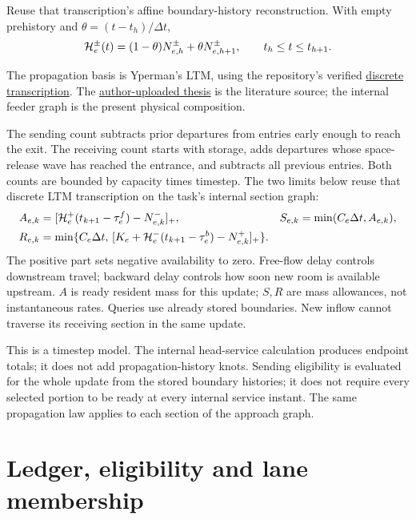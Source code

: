\documentclass[10pt,a4paper]{article}
\newcommand{\pos}[1]{[#1]_+}
\begin{document}
Reuse that transcription's affine boundary-history reconstruction.
With empty prehistory and $\theta=(t-t_h)/\Delta t$,
\begin{equation}
 {\cal H}^{\pm}_e(t)
 =(1-\theta)N^\pm_{e,h}+\theta N^\pm_{e,h+1},
 \qquad t_h\leq t\leq t_{h+1}.
 \label{eq:history}
\end{equation}

The propagation basis is Yperman's LTM, using the repository's verified
\href{../../../../docs/milestones/milestone_0_ltm_baseline.md}{discrete transcription}.
The \href{https://www.researchgate.net/publication/28360292_The_Link_Transmission_Model_for_dynamic_network_loading}{author-uploaded thesis}
is the literature source; the internal feeder graph is the present
physical composition.
\par

The sending count subtracts prior departures from entries early enough
to reach the exit. The receiving count starts with storage, adds departures
whose space-release wave has reached the entrance, and subtracts all
previous entries. Both counts are bounded by capacity times timestep.
The two limits below reuse that discrete LTM transcription on the task's internal section graph:
\begin{align}
 A_{e,k}&=\pos{{\cal H}^+_e(t_{k+1}-\tau^f_e)-N^-_{e,k}},
 &S_{e,k}&=\min(C_e\Delta t,A_{e,k}),\label{eq:sending}\\
 R_{e,k}&=\min\{C_e\Delta t,\,
 \pos{K_e+{\cal H}^-_e(t_{k+1}-\tau^b_e)-N^+_{e,k}}\}.
 \label{eq:receiving}
\end{align}
The positive part sets negative availability to zero. Free-flow delay
controls downstream travel; backward delay controls how soon new room
is available upstream. $A$ is ready resident mass for this update;
$S,R$ are mass allowances,
not instantaneous rates. Queries use already stored boundaries.
New inflow cannot traverse its receiving section in the same update.

This is a timestep model. The internal head-service calculation produces
endpoint totals; it does not add propagation-history knots.
Sending eligibility is evaluated for the whole update from the stored
boundary histories; it does not require every selected portion to be
ready at every internal service instant. The same propagation law
applies to each section of the approach graph.

\section{Ledger, eligibility and lane membership}
\end{document}
